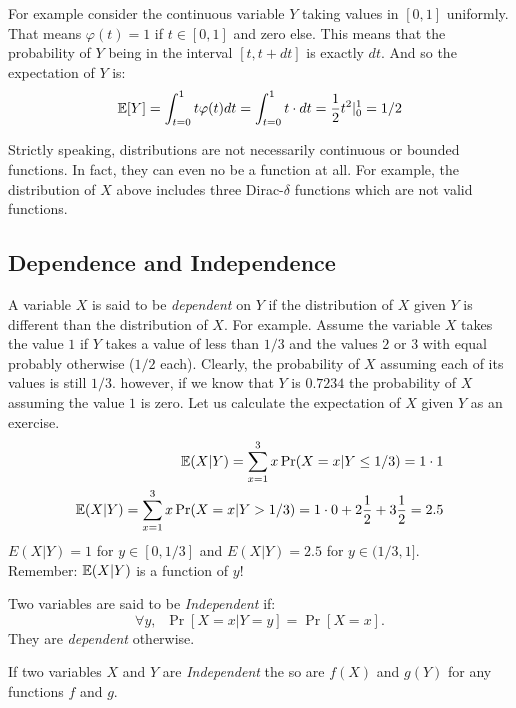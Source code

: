 \documentclass{article}
\begin{document}
For example consider the continuous variable $Y$ taking values in
$[0,1]$ uniformly. That means $\varphi(t) = 1$ if $t \in [0,1]$ and zero else.
This means that the probability of $Y$ being in the interval $[t,t + dt]$ is exactly $dt$. And so the expectation of $Y$ is:
\begin{equation}
{\mathbb E}[Y] = \int_{t=0}^{1}t \varphi(t) dt = \int_{t=0}^{1}t \cdot dt = \frac{1}{2}t^2|_{0}^{1} = 1/2
\end{equation}

\begin{remark}
Strictly speaking, distributions are not necessarily continuous or bounded functions. 
In fact, they can even no be a function at all. 
For example, the distribution of $X$ above includes three Dirac-$\delta$ functions which are not valid functions.
\end{remark}


\subsection{Dependence and Independence}
A variable $X$ is said to be {\it dependent} on $Y$ if the distribution of $X$ given $Y$ is different than the distribution of $X$. 
For example. Assume the variable $X$ takes the value $1$ if $Y$ takes a
value of less than $1/3$ and the values $2$ or $3$ with equal probably otherwise ($1/2$ each).
%
Clearly, the probability of $X$ assuming each of its values is still
$1/3$. however, if we know that $Y$ is $0.7234$ the probability of
$X$ assuming the value $1$ is zero. Let us calculate the expectation of $X$ given $Y$ as an exercise.
\begin{eqnarray}
{\mathbb E}(X | Y) = \sum_{x=1}^{3} x \Pr(X = x | Y \le 1/3) = 1\cdot 1\\
{\mathbb E}(X | Y) = \sum_{x=1}^{3} x \Pr(X = x | Y > 1/3) = 1\cdot 0 + 2
\frac{1}{2} + 3\frac{1}{2}  = 2.5
\end{eqnarray}
$E(X | Y) = 1$ for $y \in [0,1/3]$ and $E(X | Y) = 2.5$ for $y \in (1/3,1]$.\\
Remember: ${\mathbb E}(X | Y)$ is a function of $y$!

\begin{definition}[Independence]
Two variables are said to be {\it Independent} if:
\[
\forall y,\;\;\Pr[ X=x | Y = y] = \Pr[X=x].
\]
They are {\it dependent} otherwise.
\end{definition}


\begin{fact}
If two variables $X$ and $Y$ are {\it Independent} the so are $f(X)$ and $g(Y)$ for any functions $f$ and $g$.
\end{fact}
\end{document}
